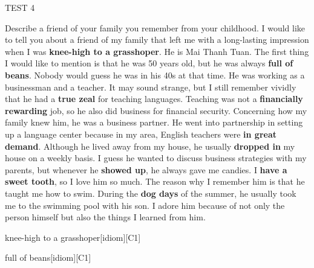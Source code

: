 \begin{glossarymc}[Cambridge 8]
\begin{test}{TEST 4}
\begin{qa}{Describe a friend of your family you remember from your childhood.}
    I would like to tell you about a friend of my family that left me with a long-lasting impression when I was \textbf{knee-high to a grasshoper}. He is Mai Thanh Tuan. The first thing I would like to mention is that he was 50 years old, but he was always \textbf{full of beans}. Nobody would guess he was in his 40s at that time. He was working as a businessman and a teacher. It may sound strange, but I still remember vividly that he had a \textbf{true zeal} for teaching languages. Teaching was not a \textbf{financially rewarding} job, so he also did business for financial security. Concerning how my family knew him, he was a business partner. He went into partnership in setting up a language center because in my area, English teachers were \textbf{in great demand}. Although he lived away from my house, he usually \textbf{dropped in} my house on a weekly basis. I guess he wanted to discuss business strategies with my parents, but whenever he \textbf{showed up}, he always gave me candies. I \textbf{have a sweet tooth}, so I love him so much. The reason why I remember him is that he taught me how to swim. During the \textbf{dog days} of the summer, he usually took me to the swimming pool with his son. I adore him because of not only the person himself but also the things I learned from him.
    \end{qa}

        \begin{VocabExplain}[Part 2]
            \begin{ExplainCard}{knee-high to a grasshoper}[idiom][C1]
            \end{ExplainCard}

            \begin{ExplainCard}{full of beans}[idiom][C1]
            \end{ExplainCard}


\end{VocabExplain}
\end{test}
\end{glossarymc}
